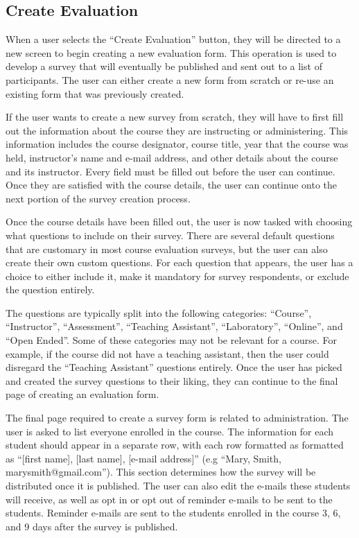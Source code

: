 \documentclass{article}
\begin{document}
\subsection{Create Evaluation}

When a user selects the ``Create Evaluation'' button, they will be directed to a new screen to begin creating a new evaluation form. This operation is used to develop a survey that will eventually be published and sent out to a list of participants. The user can either create a new form from scratch or re-use an existing form that was previously created.

If the user wants to create a new survey from scratch, they will have to first fill out the information about the course they are instructing or administering. This information includes the course designator, course title, year that the course was held, instructor's name and e-mail address, and other details about the course and its instructor. Every field must be filled out before the user can continue. Once they are satisfied with the course details, the user can continue onto the next portion of the survey creation process.

Once the course details have been filled out, the user is now tasked with choosing what questions to include on their survey. There are several default questions that are customary in most course evaluation surveys, but the user can also create their own custom questions. For each question that appears, the user has a choice to either include it, make it mandatory for survey respondents, or exclude the question entirely.

The questions are typically split into the following categories: ``Course'', ``Instructor'', ``Assessment'', ``Teaching Assistant'', ``Laboratory'', ``Online'', and ``Open Ended''. Some of these categories may not be relevant for a course. For example, if the course did not have a teaching assistant, then the user could disregard the ``Teaching Assistant'' questions entirely. Once the user has picked and created the survey questions to their liking, they can continue to the final page of creating an evaluation form.

The final page required to create a survey form is related to administration. The user is asked to list everyone enrolled in the course. The information for each student should appear in a separate row, with each row formatted as formatted as ``[first name], [last name], [e-mail address]'' (e.g ``Mary, Smith, marysmith@gmail.com''). This section determines how the survey will be distributed once it is published. The user can also edit the e-mails these students will receive, as well as opt in or opt out of reminder e-mails to be sent to the students. Reminder e-mails are sent to the students enrolled in the course 3, 6, and 9 days after the survey is published.
\end{document}
